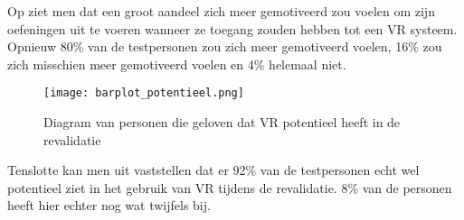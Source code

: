 Op \cite{figuur 6.9} ziet men dat een groot aandeel zich meer gemotiveerd zou voelen om zijn oefeningen uit te voeren wanneer ze toegang zouden hebben tot een VR systeem. Opnieuw 80\% van de testpersonen zou zich meer gemotiveerd voelen, 16\% zou zich misschien meer gemotiveerd voelen en 4\% helemaal niet.

\begin{figure}[h]
    \centering
    \texttt{[image: barplot\_potentieel.png]}
    \caption{Diagram van personen die geloven dat VR potentieel heeft in de revalidatie}
    \label{figuur 6.10}
\end{figure}

Tenslotte kan men uit \cite{figuur 6.10} vaststellen dat er 92\% van de testpersonen echt wel potentieel ziet in het gebruik van VR tijdens de revalidatie. 8\% van de personen heeft hier echter nog wat twijfels bij.

